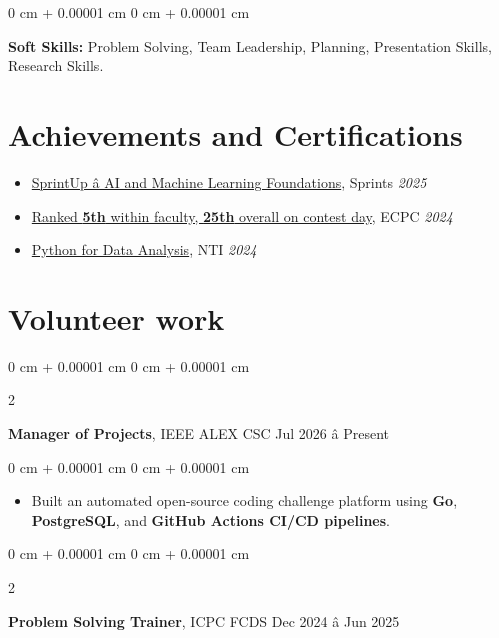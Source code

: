 \documentclass[9pt, letterpaper]{extarticle}
\newenvironment{highlights}{
    \begin{itemize}[
        topsep=0.06 cm,
        parsep=0.06 cm,
        partopsep=0pt,
        itemsep=0pt,
        leftmargin=0 cm + 10pt
    ]
}{
    \end{itemize}
} %
\newenvironment{onecolentry}{
    \begin{adjustwidth}{
        0 cm + 0.00001 cm
    }{
        0 cm + 0.00001 cm
    }
}{
    \end{adjustwidth}
} %
\newenvironment{twocolentry}[2][]{
    \onecolentry
    \def\secondColumn{#2}
    \setcolumnwidth{\fill, 4.5 cm}
    \begin{paracol}{2}
}{
    \switchcolumn \raggedleft \secondColumn
    \end{paracol}
    \endonecolentry
} %
\begin{document}
        \begin{onecolentry}
            \textbf{Soft Skills:} Problem Solving, Team Leadership, Planning, Presentation Skills, Research Skills.
        \end{onecolentry}
        
    \section{Achievements and Certifications}
    \begin{highlights}
        
        \item 
        {\href{https://sprints.ai/en/journeys/learning/ID%20-%20SPR%20-%20N4O710/view-certificate-serial}{SprintUp â AI and Machine Learning Foundations}, Sprints \hfill \textit{2025}}
        
        \item 
        {\href{https://drive.google.com/file/d/.../view}{Ranked \textbf{5th} within faculty, \textbf{25th} overall on contest day}, ECPC \hfill \textit{2024}}
        
        \item {\href{https://drive.google.com/file/d/1ln6sfhXI8nz9Kugjy5CBRLjSbXPmQs1f/view?pli=1}{Python for Data Analysis}, NTI \hfill \textit{2024}}
        
        
        
    \end{highlights}

    
    \section{Volunteer work}

        \begin{twocolentry}{
            Jul 2026 â Present
        }
            \textbf{Manager of Projects}, IEEE ALEX CSC\end{twocolentry}

        \begin{onecolentry}
            \begin{highlights}
                \item Built an automated open-source coding challenge platform using \textbf{Go}, \textbf{PostgreSQL}, and \textbf{GitHub Actions CI/CD pipelines}.
            \end{highlights}
        \end{onecolentry}

        
        \begin{twocolentry}{
            Dec 2024 â Jun 2025
        }
            \textbf{Problem Solving Trainer}, ICPC FCDS\end{twocolentry}
\end{document}
